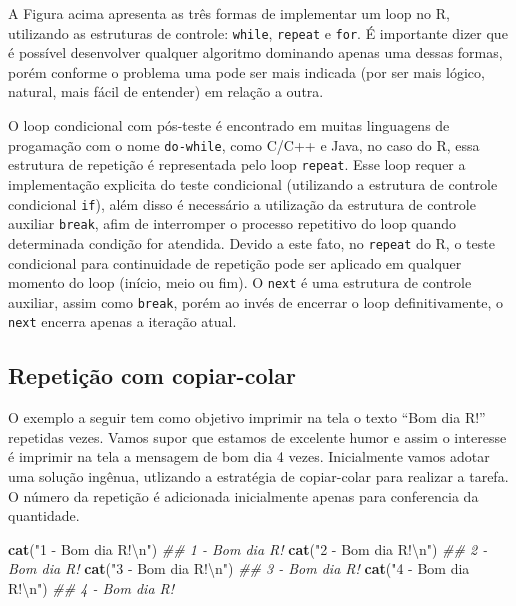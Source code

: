 \documentclass[
  11pt,
  a5paper,
  openany]{book}
\newenvironment{Shaded}{\begin{snugshade}}{\end{snugshade}}
\newcommand{\CharTok}[1]{\textcolor[rgb]{0.31,0.60,0.02}{#1}}
\newcommand{\CommentTok}[1]{\textcolor[rgb]{0.56,0.35,0.01}{\textit{#1}}}
\newcommand{\KeywordTok}[1]{\textcolor[rgb]{0.13,0.29,0.53}{\textbf{#1}}}
\newcommand{\NormalTok}[1]{#1}
\newcommand{\StringTok}[1]{\textcolor[rgb]{0.31,0.60,0.02}{#1}}
\begin{document}
A Figura acima apresenta as três formas de implementar um loop no R, utilizando as estruturas de controle: \texttt{while}, \texttt{repeat} e \texttt{for}. É importante dizer que é possível desenvolver qualquer algoritmo dominando apenas uma dessas formas, porém conforme o problema uma pode ser mais indicada (por ser mais lógico, natural, mais fácil de entender) em relação a outra.

O loop condicional com pós-teste é encontrado em muitas linguagens de progamação com o nome \texttt{do-while}, como C/C++ e Java, no caso do R, essa estrutura de repetição é representada pelo loop \texttt{repeat}. Esse loop requer a implementação explicita do teste condicional (utilizando a estrutura de controle condicional \texttt{if}), além disso é necessário a utilização da estrutura de controle auxiliar \texttt{break}, afim de interromper o processo repetitivo do loop quando determinada condição for atendida. Devido a este fato, no \texttt{repeat} do R, o teste condicional para continuidade de repetição pode ser aplicado em qualquer momento do loop (início, meio ou fim). O \texttt{next} é uma estrutura de controle auxiliar, assim como \texttt{break}, porém ao invés de encerrar o loop definitivamente, o \texttt{next} encerra apenas a iteração atual.

\hypertarget{repetiuxe7uxe3o-com-copiar-colar}{%
\subsection{Repetição com copiar-colar}\label{repetiuxe7uxe3o-com-copiar-colar}}

O exemplo a seguir tem como objetivo imprimir na tela o texto ``Bom dia R!'' repetidas vezes. Vamos supor que estamos de excelente humor e assim o interesse é imprimir na tela a mensagem de bom dia 4 vezes. Inicialmente vamos adotar uma solução ingênua, utlizando a estratégia de copiar-colar para realizar a tarefa. O número da repetição é adicionada inicialmente apenas para conferencia da quantidade.

\begin{Shaded}
\begin{Highlighting}[]
\KeywordTok{cat}\NormalTok{(}\StringTok{"1 - Bom dia R!}\CharTok{\textbackslash{}n}\StringTok{"}\NormalTok{)}
\CommentTok{## 1 - Bom dia R!}
\KeywordTok{cat}\NormalTok{(}\StringTok{"2 - Bom dia R!}\CharTok{\textbackslash{}n}\StringTok{"}\NormalTok{)}
\CommentTok{## 2 - Bom dia R!}
\KeywordTok{cat}\NormalTok{(}\StringTok{"3 - Bom dia R!}\CharTok{\textbackslash{}n}\StringTok{"}\NormalTok{)}
\CommentTok{## 3 - Bom dia R!}
\KeywordTok{cat}\NormalTok{(}\StringTok{"4 - Bom dia R!}\CharTok{\textbackslash{}n}\StringTok{"}\NormalTok{)}
\CommentTok{## 4 - Bom dia R!}
\end{Highlighting}
\end{Shaded}
\end{document}
